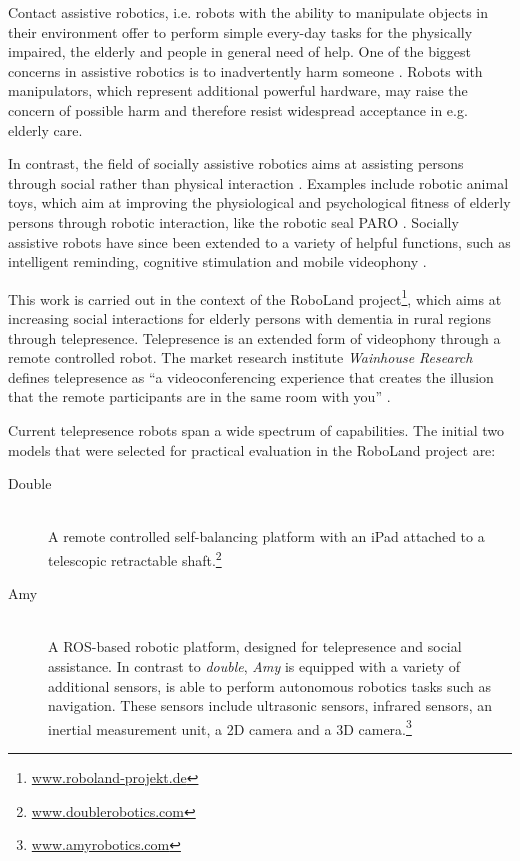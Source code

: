 Contact assistive robotics, i.e. robots with the ability to manipulate objects in their environment offer to perform simple every-day tasks for the physically impaired, the elderly and people in general need of help.
One of the biggest concerns in assistive robotics is to inadvertently harm someone \cite{mataric_socially_2016}.
Robots with manipulators, which represent additional powerful hardware, may raise the concern of possible harm and therefore resist widespread acceptance in e.g. elderly care.

In contrast, the field of socially assistive robotics aims at assisting persons through social rather than physical interaction \cite{feil-seifer_defining_2005}.
Examples include robotic animal toys, which aim at improving the physiological and psychological fitness of elderly persons through robotic interaction, like the robotic seal PARO \cite{wada_analysis_2002}.
Socially assistive robots have since been extended to a variety of helpful functions, such as intelligent reminding, cognitive stimulation and mobile videophony \cite{gross_progress_2011}.

This work is carried out in the context of the RoboLand project\footnote{\url{www.roboland-projekt.de}}, which aims at increasing social interactions for elderly persons with dementia in rural regions through telepresence.
Telepresence is an extended form of videophony through a remote controlled robot.
The market research institute \textit{Wainhouse Research} defines telepresence as ``a videoconferencing experience that creates the illusion that the remote participants are in the same room with you'' \cite{davis_telepresence_2007}.

Current telepresence robots span a wide spectrum of capabilities.
The initial two models that were selected for practical evaluation in the RoboLand project are:
\begin{description}
    \item[Double] \hfill\\
    A remote controlled self-balancing platform with an iPad attached to a telescopic retractable shaft.\footnote{\url{www.doublerobotics.com}} 
    \item[Amy] \hfill\\
    A ROS-based robotic platform, designed for telepresence and social assistance.
    In contrast to \textit{double}, \textit{Amy} is equipped with a variety of additional sensors, is able to perform autonomous robotics tasks such as navigation.
    These sensors include ultrasonic sensors, infrared sensors, an inertial measurement unit, a 2D camera and a 3D camera.\footnote{\url{www.amyrobotics.com}}
\end{description}


